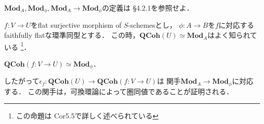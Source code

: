 \documentclass[a4paper, dvipdfmx]{jsarticle}
\newcommand{\QCoh}{\mathbf{QCoh}}
\newcommand{\Mod}{\mathbf{Mod}}
\begin{document}
    $\Mod_A, \Mod_{\phi}, \Mod_A \to \Mod_{\phi}$の定義は
    \cite{NoteGroTop} \S4.2.1を参照せよ．

    $f \colon V \to U$をflat surjective morphism of $S$-schemesとし，
    $\phi \colon A \to B$を$f$に対応するfaithfully flatな環準同型とする．
    この時，$\QCoh(U) \simeq \Mod_A$はよく知られている
    \footnote{この命題は\cite{HarAG} Cor5.5で詳しく述べられている}．
    \begin{Claim}
        $\QCoh(f \colon V \to U) \simeq \Mod_{\phi}$．
    \end{Claim}
    したがって$\epsilon_{f} \colon \QCoh(U) \to \QCoh(f \colon V \to U)$は
    関手$\Mod_A \to \Mod_{\phi}$に対応する．
    この関手は，可換環論によって圏同値であることが証明される．



\end{document}
